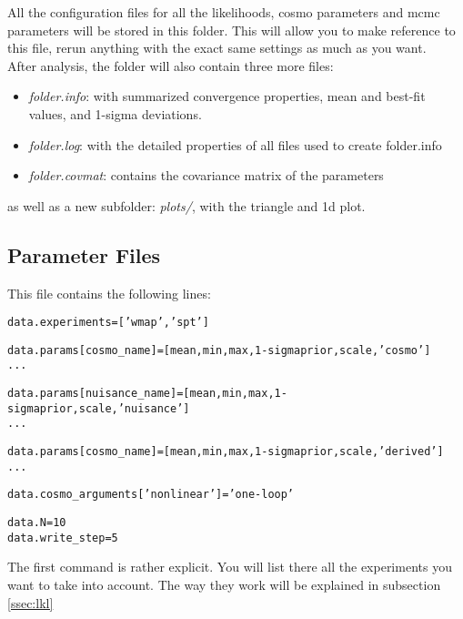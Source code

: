 \documentclass[10pt]{article}
\begin{document}
  All the configuration files for all the likelihoods, cosmo parameters and
  mcmc parameters will be stored in this folder. This will allow you to make
  reference to this file, rerun anything with the exact same settings as much
  as you want.\\

  After analysis, the folder will also contain three more files:
  \begin{itemize}
    \item \emph{folder.info}: with summarized convergence properties, mean and
      best-fit values, and 1-sigma deviations.
    \item \emph{folder.log}:  with the detailed properties of all files used to create
      folder.info
    \item \emph{folder.covmat}: contains the covariance matrix of the parameters
  \end{itemize}
  as well as a new subfolder: \emph{plots/}, with the triangle and 1d plot.



  \subsection{Parameter Files}
  This file contains the following lines:

  \begin{alltt}
    data.experiments = ['wmap','spt']
    
    data.params[cosmo_name]       = [mean,min,max,1-sigma prior,scale,'cosmo']
    ...

    data.params[nuisance_name]    = [mean,min,max,1-sigma prior,scale,'nuisance']
    ...

    data.params[cosmo_name]       = [mean,min,max,1-sigma prior,scale,'derived']
    ...

    data.cosmo_arguments['non linear']           = 'one-loop'

    data.N = 10
    data.write_step = 5
  \end{alltt}

  The first command is rather explicit. You will list there all the experiments
  you want to take into account. The way they work will be explained in
  subsection \ref{ssec:lkl}\\
\end{document}
